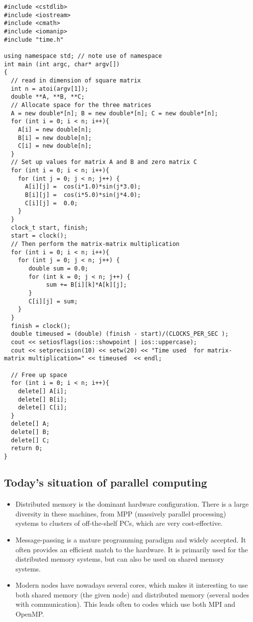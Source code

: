 \documentclass[%
oneside,                 %
final,                   %
10pt]{article}
\begin{document}
\begin{Verbatim}[numbers=none,fontsize=\fontsize{9pt}{9pt},baselinestretch=0.95]
#include <cstdlib>
#include <iostream>
#include <cmath>
#include <iomanip>
#include "time.h"

using namespace std; // note use of namespace
int main (int argc, char* argv[])
{
  // read in dimension of square matrix
  int n = atoi(argv[1]);
  double **A, **B, **C;
  // Allocate space for the three matrices
  A = new double*[n]; B = new double*[n]; C = new double*[n];
  for (int i = 0; i < n; i++){
    A[i] = new double[n];
    B[i] = new double[n];
    C[i] = new double[n];
  }
  // Set up values for matrix A and B and zero matrix C
  for (int i = 0; i < n; i++){
    for (int j = 0; j < n; j++) {
      A[i][j] =  cos(i*1.0)*sin(j*3.0);
      B[i][j] =  cos(i*5.0)*sin(j*4.0);
      C[i][j] =  0.0;    
    }
  }
  clock_t start, finish;
  start = clock();
  // Then perform the matrix-matrix multiplication
  for (int i = 0; i < n; i++){
    for (int j = 0; j < n; j++) {
       double sum = 0.0;
       for (int k = 0; j < n; j++) {
            sum += B[i][k]*A[k][j];
       }
       C[i][j] = sum;
    }
  }
  finish = clock();
  double timeused = (double) (finish - start)/(CLOCKS_PER_SEC );
  cout << setiosflags(ios::showpoint | ios::uppercase);
  cout << setprecision(10) << setw(20) << "Time used  for matrix-matrix multiplication=" << timeused  << endl;

  // Free up space
  for (int i = 0; i < n; i++){
    delete[] A[i];
    delete[] B[i];
    delete[] C[i];
  }
  delete[] A;
  delete[] B;
  delete[] C;
  return 0;
}

\end{Verbatim}


\subsection*{Today's situation of parallel computing}

\paragraph{}

\begin{itemize}
\item Distributed memory is the dominant hardware configuration. There is a large diversity in these machines, from  MPP (massively parallel processing) systems to clusters of off-the-shelf PCs, which are very cost-effective.

\item Message-passing is a mature programming paradigm and widely accepted. It often provides an efficient match to the hardware. It is primarily used for the distributed memory systems, but can also be used on shared memory systems.

\item Modern nodes have nowadays several cores, which makes it interesting to use both shared memory (the given node) and distributed memory (several nodes with communication). This leads often to codes which use both MPI and OpenMP.
\end{itemize}
\end{document}
